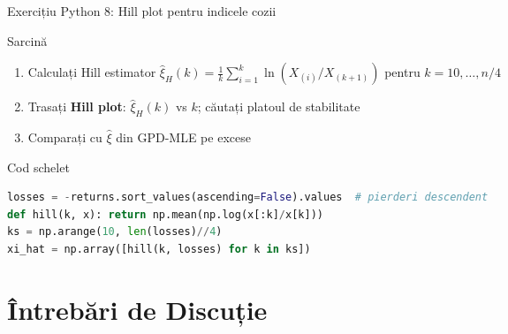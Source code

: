 \documentclass[9pt, aspectratio=169, t]{beamer}
\begin{document}
\begin{frame}[fragile,shrink=10]{Exercițiu Python 8: Hill plot pentru indicele cozii}
\begin{cminipage}{0.95\textwidth}
    \begin{block}{Sarcină}
    \begin{enumerate}\setlength{\itemsep}{0pt}
        \item Calculați Hill estimator $\hat{\xi}_H(k) = \frac{1}{k}\sum_{i=1}^k \ln(X_{(i)}/X_{(k+1)})$ pentru $k = 10, \dots, n/4$
        \item Trasați \textbf{Hill plot}: $\hat{\xi}_H(k)$ vs $k$; căutați platoul de stabilitate
        \item Comparați cu $\hat{\xi}$ din GPD-MLE pe excese
    \end{enumerate}
    \end{block}
    \begin{exampleblock}{Cod schelet}
\begin{lstlisting}[language=Python]
losses = -returns.sort_values(ascending=False).values  # pierderi descendent
def hill(k, x): return np.mean(np.log(x[:k]/x[k]))
ks = np.arange(10, len(losses)//4)
xi_hat = np.array([hill(k, losses) for k in ks])
\end{lstlisting}
    \end{exampleblock}
\end{cminipage}
\end{frame}

\section{Întrebări de Discuție}
\end{document}
